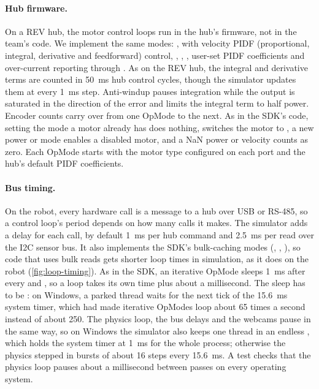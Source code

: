 \documentclass[10pt,twocolumn,letterpaper]{article}
\begin{document}
\paragraph{Hub firmware.} On a REV hub, the motor control loops run in the hub's firmware, not in the team's code. We implement the same modes: ,  with velocity PIDF (proportional, integral, derivative and feedforward) control, , , , user-set PIDF coefficients and over-current reporting through . As on the REV hub, the integral and derivative terms are counted in 50~ms hub control cycles, though the simulator updates them at every 1~ms step. Anti-windup \citep{astrom2008feedback} pauses integration while the output is saturated in the direction of the error and limits the integral term to half power. Encoder counts carry over from one OpMode to the next. As in the SDK's code, setting the mode a motor already has does nothing,  switches the motor to , a new power or mode enables a disabled motor, and a NaN power or velocity counts as zero. Each OpMode starts with the motor type configured on each port and the hub's default PIDF coefficients.

\paragraph{Bus timing.} On the robot, every hardware call is a message to a hub over USB or RS-485, so a control loop's period depends on how many calls it makes. The simulator adds a delay for each call, by default 1~ms per hub command and 2.5~ms per read over the I2C sensor bus. It also implements the SDK's bulk-caching modes (, , ), so code that uses bulk reads gets shorter loop times in simulation, as it does on the robot (\cref{fig:loop-timing}). As in the SDK, an iterative OpMode sleeps 1~ms after every  and , so a loop takes its own time plus about a millisecond. The sleep has to be : on Windows, a parked thread waits for the next tick of the 15.6~ms system timer, which had made iterative OpModes loop about 65 times a second instead of about 250. The physics loop, the bus delays and the webcams pause in the same way, so on Windows the simulator also keeps one thread in an endless , which holds the system timer at 1~ms for the whole process; otherwise the physics stepped in bursts of about 16 steps every 15.6~ms. A test checks that the physics loop pauses about a millisecond between passes on every operating system.
\end{document}
